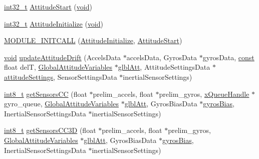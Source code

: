 \begin{DoxyCompactItemize}
\item 
\hyperlink{group___n_a_m_e_gafd12020da5a235dfcf0c3c748fb5baed}{int32\-\_\-t} \hyperlink{group___attitude_gaaa0dba388f0dec215cb7cbe55ad0356b}{Attitude\-Start} (\hyperlink{group___n_a_m_e_ga18028b8badbf1ea7e704ccac3c488e82}{void})
\item 
\hyperlink{group___n_a_m_e_gafd12020da5a235dfcf0c3c748fb5baed}{int32\-\_\-t} \hyperlink{group___attitude_gab3e9047ab7c9b02bd61091a4a2e8f572}{Attitude\-Initialize} (\hyperlink{group___n_a_m_e_ga18028b8badbf1ea7e704ccac3c488e82}{void})
\item 
\hyperlink{group___attitude_ga785ebe70505bccce89d20aacd7996a21}{M\-O\-D\-U\-L\-E\-\_\-\-I\-N\-I\-T\-C\-A\-L\-L} (\hyperlink{group___attitude_gab3e9047ab7c9b02bd61091a4a2e8f572}{Attitude\-Initialize}, \hyperlink{group___attitude_gaaa0dba388f0dec215cb7cbe55ad0356b}{Attitude\-Start})
\item 
\hyperlink{group___n_a_m_e_ga18028b8badbf1ea7e704ccac3c488e82}{void} \hyperlink{group___attitude_gacf73f90ae39bfb7e42e688376f9cf5ef}{update\-Attitude\-Drift} (Accels\-Data $\ast$accels\-Data, Gyros\-Data $\ast$gyros\-Data, \hyperlink{group___n_a_m_e_ga7ae6d0e43244213b34de2c2b9aa30da6}{const} float del\-T, \hyperlink{struct_global_attitude_variables}{Global\-Attitude\-Variables} $\ast$\hyperlink{group___state_ga76682d72011dc0109f1d5cf25a6c6da0}{glbl\-Att}, Attitude\-Settings\-Data $\ast$\hyperlink{group___state_ga8f6543ab52bafea6c0858baeeae8db59}{attitude\-Settings}, Sensor\-Settings\-Data $\ast$inertial\-Sensor\-Settings)
\item 
\hyperlink{stdint_8h_ad566f6541e98b74246db1a3a3a85ad49}{int8\-\_\-t} \hyperlink{group___attitude_ga7b51e65077e182551c02a9906849c8d8}{get\-Sensors\-C\-C} (float $\ast$prelim\-\_\-accels, float $\ast$prelim\-\_\-gyros, \hyperlink{_common_2_libraries_2_free_r_t_o_s_2_source_2include_2queue_8h_a229037f755b756156e34a440ce134b8b}{x\-Queue\-Handle} $\ast$gyro\-\_\-queue, \hyperlink{struct_global_attitude_variables}{Global\-Attitude\-Variables} $\ast$\hyperlink{group___state_ga76682d72011dc0109f1d5cf25a6c6da0}{glbl\-Att}, Gyros\-Bias\-Data $\ast$\hyperlink{group___state_ga233a2d6850e9c466f80ae6bb2ebd98e8}{gyros\-Bias}, Inertial\-Sensor\-Settings\-Data $\ast$inertial\-Sensor\-Settings)
\item 
\hyperlink{stdint_8h_ad566f6541e98b74246db1a3a3a85ad49}{int8\-\_\-t} \hyperlink{group___attitude_ga13859f6d28a13807ea66fa653165ba0e}{get\-Sensors\-C\-C3\-D} (float $\ast$prelim\-\_\-accels, float $\ast$prelim\-\_\-gyros, \hyperlink{struct_global_attitude_variables}{Global\-Attitude\-Variables} $\ast$\hyperlink{group___state_ga76682d72011dc0109f1d5cf25a6c6da0}{glbl\-Att}, Gyros\-Bias\-Data $\ast$\hyperlink{group___state_ga233a2d6850e9c466f80ae6bb2ebd98e8}{gyros\-Bias}, Inertial\-Sensor\-Settings\-Data $\ast$inertial\-Sensor\-Settings)

\end{DoxyCompactItemize}
